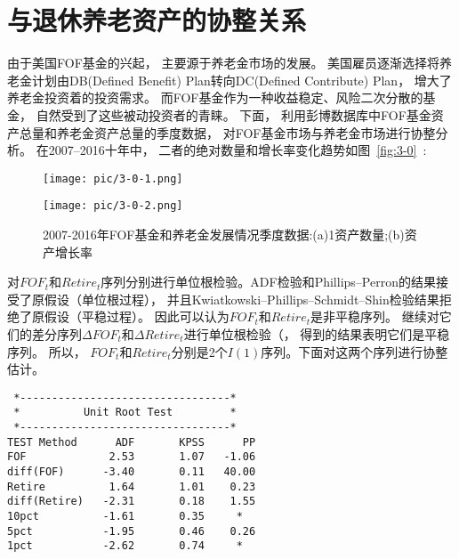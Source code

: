 
\section{与退休养老资产的协整关系}
由于美国FOF基金的兴起， 主要源于养老金市场的发展。 美国雇员逐渐选择将养老金计划由DB(Defined Benefit) Plan转向DC(Defined Contribute) Plan， 增大了养老金投资着的投资需求。 而FOF基金作为一种收益稳定、风险二次分散的基金， 自然受到了这些被动投资者的青睐。 下面， 利用彭博数据库中FOF基金资产总量和养老金资产总量的季度数据， 对FOF基金市场与养老金市场进行协整分析。 在2007--2016十年中， 二者的绝对数量和增长率变化趋势如图~\ref{fig:3-0}~:



\begin{figure}[ht]
	\begin{minipage}[ht]{0.47\textwidth}
		\centering
		\texttt{[image: pic/3-0-1.png]}
		\subcaption{}\label{pic/3-0-1.png}
	\end{minipage}%
	\hspace{0.06\textwidth}
	\begin{minipage}[ht]{0.47\textwidth}
		\centering
		\texttt{[image: pic/3-0-2.png]}
		\subcaption{}\label{pic/3-0-2.png}
	\end{minipage}
	\caption{2007-2016年FOF基金和养老金发展情况季度数据:(a)1资产数量;(b)资产增长率}
\end{figure}





对${FOF_t}$和${Retire_t}$序列分别进行单位根检验。ADF检验和Phillips–Perron的结果接受了原假设（单位根过程）， 并且Kwiatkowski–Phillips–Schmidt–Shin检验结果拒绝了原假设（平稳过程）。 因此可以认为${FOF_t}$和${Retire_t}$是非平稳序列。
继续对它们的差分序列${\Delta FOF_t}$和${\Delta Retire_t}$进行单位根检验（， 得到的结果表明它们是平稳序列。 所以， ${FOF_t}$和${Retire_t}$分别是2个$I(1)$序列。下面对这两个序列进行协整估计。

\begin{framed}
\begin{verbatim}
 *---------------------------------*                         
 *          Unit Root Test         *                           
 *---------------------------------*
TEST Method      ADF       KPSS      PP  
FOF             2.53       1.07   -1.06
diff(FOF)      -3.40       0.11   40.00
Retire          1.64       1.01    0.23
diff(Retire)   -2.31       0.18    1.55
10pct          -1.61       0.35     *  
5pct           -1.95       0.46    0.26
1pct           -2.62       0.74     *  
\end{verbatim}
\end{framed}


